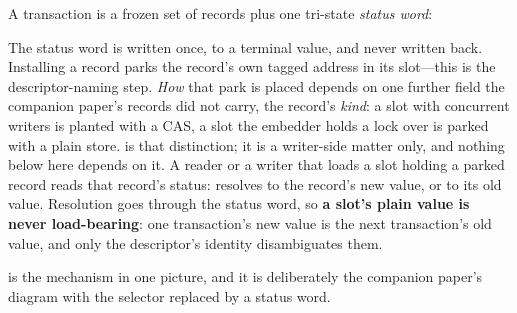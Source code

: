 \documentclass[11pt]{article}
\begin{document}
A transaction is a frozen set of records plus one tri-state \emph{status word}:
%
%
\begin{center}
\end{center}
The status word is written once, to a terminal value, and never written back.
Installing a record parks the record's own tagged address in its slot---this is
the descriptor-naming step. \emph{How} that park is placed depends on one further
field the companion paper's records did not carry, the record's \emph{kind}: a
slot with concurrent writers is planted with a CAS, a slot the embedder holds a
lock over is parked with a plain store.  is that distinction; it
is a writer-side matter only, and nothing below here depends on it. A
reader or a writer that loads a slot holding a parked record reads that record's
status: \SUCCEEDED resolves to the record's new value, \UNDECIDED or \FAILED to
its old value. Resolution goes through the status word, so \textbf{a slot's plain
value is never load-bearing}: one transaction's new value is the next
transaction's old value, and only the descriptor's identity disambiguates them.

 is the mechanism in one picture, and it is deliberately the
companion paper's diagram with the selector replaced by a status word.


\end{document}
